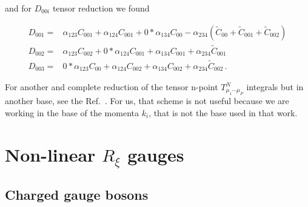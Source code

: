 and for $D_{00i}$ tensor reduction we found

\begin{align}
\label{eq:D00i-reduction}
D_{001} =& \alpha_{123}C_{001}+\alpha_{124}C_{001}+0*\alpha_{134}C_{00}-\alpha_{234}\left(\tilde{C}_{00}+\tilde{C}_{001}+\tilde{C}_{002}\right)\nonumber \\
D_{002} =& \alpha_{123}C_{002}+0*\alpha_{124}C_{001}+\alpha_{134}C_{001}+\alpha_{234}\tilde{C}_{001}\nonumber \\
D_{003} =& 0*\alpha_{123}C_{00}+\alpha_{124}C_{002}+\alpha_{134}C_{002}+\alpha_{234}\tilde{C}_{002}\,.
\end{align}

\noindent
For another and complete reduction of the tensor n-point $T^N_{\mu_1\cdots \mu_{P}}$ integrals but in another base, see the Ref.~\cite{STUART1988367}. For us, that scheme is not useful because we are working in the base of the momenta $k_i$, that is not the base used in that work. 










\section{Non-linear $R_\xi$ gauges}
\label{sec:Gauge}
\subsection{Charged gauge bosons }

\begin{comment}
The most general Lagrangian for a charged gauge boson $\phi_\mu$ is 

\begin{equation}
%
{\cal L }\bigg|_{\substack{\text{Vector}\\\text{Mediators}}} =-\frac{1}{2}\left({\cal D}_\mu \medpVcov{\nu} -{\cal D}_\nu \medpVcov{\mu} \right)\left({\cal D}^\mu \medp^{\nu} -{\cal D}^\nu \medp^{\mu} \right)+ \mmed^2\, \medm^{\mu}\medp_\mu+ie\,{\cal abcdefghijklmnopqrstuvwxyz}F^{\mu\nu} \medp_\mu\medpVcov{\nu} +\delta{\cal L}\, .
\label{eq:VectorMediatorAp}
\end{equation}
\end{comment}

